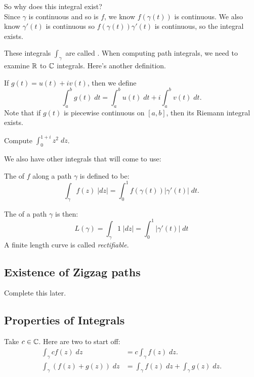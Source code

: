 \documentclass[notes]{subfile}
\begin{document}
So why does this integral exist?\\

Since $\gamma$ is continuous and so is $f$, we know $f(\gamma(t))$
is continuous.
We also know $\gamma'(t)$ is continuous so $f(\gamma(t))\gamma'(t)$
is continuous, so the integral exists.

These integrals $\int_{\gamma}$ are called .
When computing path integrals, we need to examine $\R$ to $\C$ 
integrals.  Here's another definition.

\begin{definition}[$\R$ to $\C$ integrals]
    If $g(t) = u(t) + iv(t)$, then we define
    \[ \int_a^b g(t) \; dt = \int_a^b u(t) \; dt + i
    \int_a^b v(t) \; dt. \]
    Note that if $g(t)$ is piecewise continuous on $[a,b]$,
    then its Riemann integral exists.
\end{definition}

\begin{exercise}
    Compute $\int_0^{1+i} z^2 \; dz$.
\end{exercise}

We also have other integrals that will come to use:
\begin{definition}
    The  of $f$ along a path $\gamma$ is
    defined to be:
    \[ \int_{\gamma} f(z) \; |dz| = \int_0^1 f(\gamma(t)) 
    |\gamma'(t)| \; dt. \]
\end{definition}

The  of a path $\gamma$ is then:
\[ L(\gamma) = \int_{\gamma} 1 \; |dz| = \int_0^1 |\gamma'(t)| \; dt\]
A finite length curve is called \textit{rectifiable}.

\subsection{Existence of Zigzag paths}
Complete this later.



\subsection{Properties of Integrals}
Take $c \in \operatorname{\mathbb{C}}$.
Here are two to start off:
\begin{align}
    \int_{\gamma} cf(z) \; dz &= c \int_{\gamma} f(z) \; dz. \\
    \int_{\gamma} (f(z) + g(z)) \; dz &=
        \int_{\gamma} f(z) \; dz + \int_{\gamma} g(z) \; dz.
\end{align}
\end{document}
